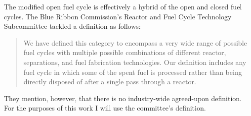 The modified open fuel cycle is effectively a hybrid of the open and closed fuel
cycles. The Blue Ribbon Commission's Reactor and Fuel Cycle
Technology Subcommittee tackled a definition as follows:

\begin{quotation}
We have defined this category to encompass a very wide range of possible fuel
cycles with multiple possible combinations of different reactor, separations,
and fuel fabrication technologies. Our definition includes any fuel cycle in
which some of the spent fuel is processed rather than being directly disposed of
after a single pass through a reactor.~\cite{brc_reactor_2012}
\end{quotation}

They mention, however, that there is no industry-wide agreed-upon
definition. For the purposes of this work I will use the committee's
definition.
